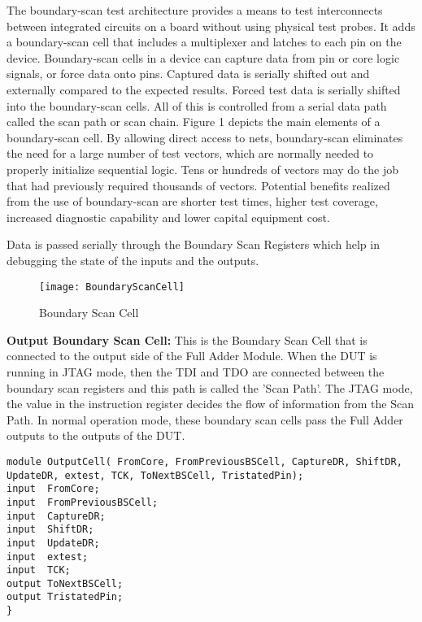 \documentclass[a4paper,11pt]{article}
\begin{document}
The boundary-scan test architecture provides a means to test interconnects between integrated circuits on a board without using physical test probes. It adds a boundary-scan cell that includes a multiplexer and latches to each pin on the device. Boundary-scan cells in a device can capture data from pin or core logic signals, or force data onto pins. Captured data is serially shifted out and externally compared to the expected results. Forced test data is serially shifted into the boundary-scan cells. All of this is controlled from a serial data path called the scan path or scan chain. Figure 1 depicts the main elements of a boundary-scan cell. By allowing direct access to nets, boundary-scan eliminates the need for a large number of test vectors, which are normally needed to properly initialize sequential logic. Tens or hundreds of vectors may do the job that had previously required thousands of vectors. Potential benefits realized from the use of boundary-scan are shorter test times, higher test coverage, increased diagnostic capability and lower capital equipment cost.

Data is passed serially through the Boundary Scan Registers which help in debugging the state of the inputs and the outputs.

\begin{figure}[ht]
\centering
\texttt{[image: BoundaryScanCell]}
\caption{Boundary Scan Cell \cite{corelis}}
\label{fig:Boundary Scan Cell}
\end{figure}

\textbf{Output Boundary Scan Cell:}
This is the Boundary Scan Cell that is connected to the output side of the Full Adder Module. When the DUT is running in JTAG mode, then the TDI and TDO are connected between the boundary scan registers and this path is called the 'Scan Path'. The JTAG mode, the value in the instruction register decides the flow of information from the Scan Path. In normal operation mode, these boundary scan cells pass the Full Adder outputs to the outputs of the DUT.

\begin{lstlisting}[style={verilog-style}, backgroundcolor=\color{lightgray}]
module OutputCell( FromCore, FromPreviousBSCell, CaptureDR, ShiftDR, 
UpdateDR, extest, TCK, ToNextBSCell, TristatedPin);
input  FromCore;
input  FromPreviousBSCell;
input  CaptureDR;
input  ShiftDR;
input  UpdateDR;
input  extest;
input  TCK;
output ToNextBSCell;
output TristatedPin;
}
\end{lstlisting}
\end{document}
